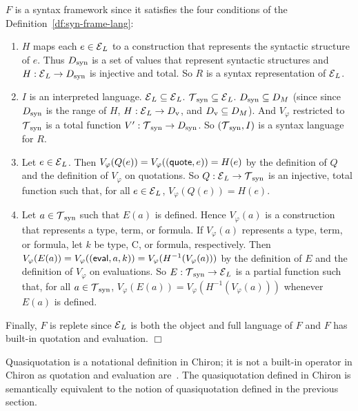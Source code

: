 \documentclass[11pt,fleqn]{article}
\newcommand{\be}{\begin{enumerate}}
\newcommand{\ee}{\end{enumerate}}
\newcommand{\dblsp}{\ \ }
\newcommand{\sE}{\mbox{$\cal E$}}
\newcommand{\sT}{\mbox{$\cal T$}}
\renewcommand{\phi}{\varphi}
\newcommand{\mname}[1]{\mbox{\sf #1}}
\newcommand{\mcolon}{\mathrel:}
\newcommand{\tarrow}{\rightarrow}
\newenvironment{proof}{\par\noindent{\bf Proof\dblsp}}{\hfill$\Box$}
\newcommand{\Dv}{D_{\rm v}}
\begin{document}
\begin{proof}
$F$ is a syntax framework since it satisfies the four conditions of
  the Definition~\ref{df:syn-frame-lang}:

\be

  \item $H$ maps each $e \in \sE_L$ to a construction that represents
    the syntactic structure of $e$.  Thus $D_{\rm syn}$ is a set of
    values that represent syntactic structures and $H: \sE_L \tarrow
    D_{\rm syn}$ is injective and total.  So $R$ is a syntax
    representation of $\sE_L$.

  \item $I$ is an interpreted language.  $\sE_L \subseteq \sE_L$.
    $\sT_{\rm syn} \subseteq \sE_L$.  $D_{\rm syn} \subseteq D_M$
    (since since $D_{\rm syn}$ is the range of $H$, $H \mcolon \sE_L
    \tarrow \Dv$, and $\Dv \subseteq D_M$).  And $V_\phi$ restricted
    to $\sT_{\rm syn}$ is a total function $V' : \sT_{\rm syn} \tarrow
    D_{\rm syn}$.  So $(\sT_{\rm syn},I)$ is a syntax language for
    $R$.

  \item Let $e \in \sE_L$.  Then $V_\phi(Q(e)) =
    V_\phi((\mname{quote},e)) = H(e)$ by the definition of $Q$ and the
    definition of $V_\phi$ on quotations. So $Q : \sE_L \tarrow
    \sT_{\rm syn}$ is an injective, total function such that, for all
    $e \in \sE_L$, $V_\phi(Q(e)) = H(e)$.

  \item Let $a \in \sT_{\rm syn}$ such that $E(a)$ is defined.  Hence
    $V_\phi(a)$ is a construction that represents a type, term, or
    formula.  If $V_\phi(a)$ represents a type, term, or formula, let
    $k$ be \mname{type}, \mname{C}, or \mname{formula},
    respectively. Then $V_\phi(E(a)) = V_\phi((\mname{eval},a,k)) =
    V_{\phi}(H^{-1}(V_{\phi}(a)))$ by the definition of $E$ and the
    definition of $V_\phi$ on evaluations.  So $E : \sT_{\rm syn}
    \tarrow \sE_L$ is a partial function such that, for all $a \in
    \sT_{\rm syn}$, $V_\phi(E(a)) = V_\phi(H^{-1}(V_\phi(a)))$
    whenever $E(a)$ is defined.

\ee
Finally, $F$ is replete since $\sE_L$ is both the object and full
language of $F$ and $F$ has built-in quotation and evaluation.
\end{proof}

\bigskip

Quasiquotation is a notational definition in Chiron; it is not a
built-in operator in Chiron as quotation and evaluation
are~\cite{Farmer12}.  The quasiquotation defined in Chiron is
semantically equivalent to the notion of quasiquotation defined in the
previous section.
\end{document}
